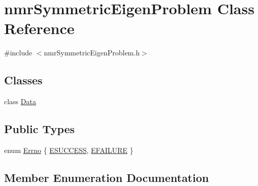 \hypertarget{classnmr_symmetric_eigen_problem}{}\section{nmr\+Symmetric\+Eigen\+Problem Class Reference}
\label{classnmr_symmetric_eigen_problem}


{\ttfamily \#include $<$nmr\+Symmetric\+Eigen\+Problem.\+h$>$}

\subsection*{Classes}
\begin{DoxyCompactItemize}
\item 
class \hyperlink{classnmr_symmetric_eigen_problem_1_1_data}{Data}
\end{DoxyCompactItemize}
\subsection*{Public Types}
\begin{DoxyCompactItemize}
\item 
enum \hyperlink{classnmr_symmetric_eigen_problem_a74a598587dbf205ee28575c65b2d3879}{Errno} \{ \hyperlink{classnmr_symmetric_eigen_problem_a74a598587dbf205ee28575c65b2d3879af116cf3f848f81de1a2cdb23f1bf06cb}{E\+S\+U\+C\+C\+E\+S\+S}, 
\hyperlink{classnmr_symmetric_eigen_problem_a74a598587dbf205ee28575c65b2d3879ab95e43dccc12a4aded9c7e68bec2ef1d}{E\+F\+A\+I\+L\+U\+R\+E}
 \}
\end{DoxyCompactItemize}


\subsection{Member Enumeration Documentation}
\hypertarget{classnmr_symmetric_eigen_problem_a74a598587dbf205ee28575c65b2d3879}{}

